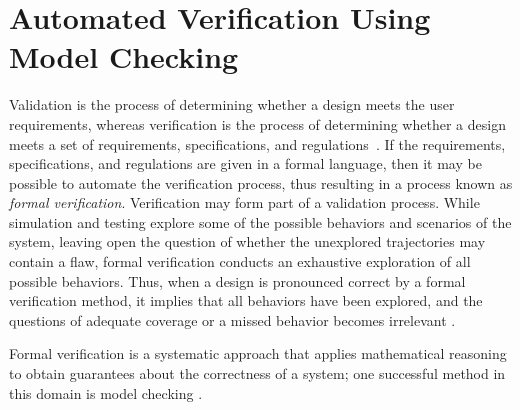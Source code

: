 \documentclass[runningheads]{llncs}
\begin{document}
\section{Automated Verification Using Model Checking}
\label{sec:AutomatedVerification}
Validation is the process of determining whether a design meets the user requirements, whereas verification is the process of determining whether a design meets a set of requirements, specifications, and regulations~\cite{ClarkeHV18}. If the requirements, specifications, and regulations are given in a formal language, then it may be possible to automate the verification process, thus resulting in a process known as \textit{formal verification}. Verification may form part of a validation process.
While simulation and testing explore some of the possible behaviors and scenarios of the system, leaving open the question of whether the unexplored trajectories may contain a flaw, formal verification conducts an exhaustive exploration of all possible behaviors. Thus, when a design is pronounced correct by a formal verification method, it implies that all behaviors have been explored, and the questions of adequate coverage or a missed behavior becomes irrelevant \cite{Clarke2012}.

Formal verification is a systematic approach that applies mathematical reasoning to obtain guarantees about the correctness of a system; one successful method in this domain is model checking \cite{Clarke2012}.
\end{document}
